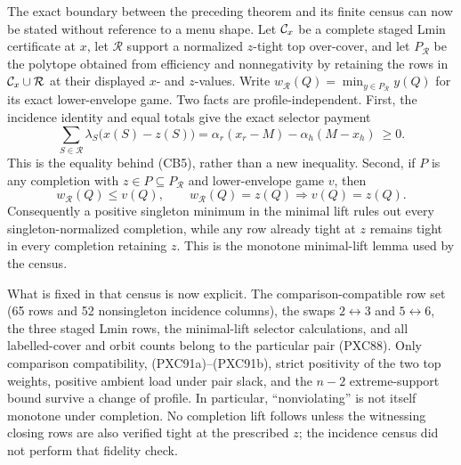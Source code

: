 \documentclass[11pt]{article}
\begin{document}
The exact boundary between the preceding theorem and its finite census can
now be stated without reference to a menu shape.  Let ${\cal C}_x$ be a
complete staged Lmin certificate at $x$, let $\mathcal R$ support a normalized
$z$-tight top over-cover, and let $P_{\mathcal R}$ be the polytope obtained from
efficiency and nonnegativity by retaining the rows in ${\cal C}_x\cup\mathcal R$
at their displayed $x$- and $z$-values.  Write
$w_{\mathcal R}(Q)=\min_{y\in P_{\mathcal R}}y(Q)$ for its exact lower-envelope
game.  Two facts are profile-independent.  First, the incidence identity and
equal totals give the exact selector payment
\[
 \sum_{S\in\mathcal R}\lambda_S\bigl(x(S)-z(S)\bigr)
 =\alpha_r(x_r-M)-\alpha_h(M-x_h)\ \ge 0 .          \tag{PXC91a}
\]
This is the equality behind (CB5), rather than a new inequality.  Second, if
$P$ is any completion with $z\in P\subseteq P_{\mathcal R}$ and lower-envelope
game $v$, then
\[
 w_{\mathcal R}(Q)\le v(Q),\qquad
 w_{\mathcal R}(Q)=z(Q)\Longrightarrow v(Q)=z(Q).  \tag{PXC91b}
\]
Consequently a positive singleton minimum in the minimal lift rules out every
singleton-normalized completion, while any row already tight at $z$ remains
tight in every completion retaining $z$.  This is the monotone minimal-lift
lemma used by the census.

What is fixed in that census is now explicit.  The comparison-compatible row
set (65 rows and 52 nonsingleton incidence columns), the swaps
$2\leftrightarrow3$ and $5\leftrightarrow6$, the three staged Lmin rows, the
minimal-lift selector calculations, and all labelled-cover and orbit counts
belong to the particular pair (PXC88).  Only comparison compatibility,
(PXC91a)--(PXC91b), strict positivity of the two top weights, positive ambient
load under pair slack, and the $n-2$ extreme-support bound survive a change of
profile.  In particular, ``nonviolating'' is not itself monotone under
completion.  No completion lift follows unless the witnessing closing rows
are also verified tight at the prescribed $z$; the incidence census did not
perform that fidelity check.
\end{document}
